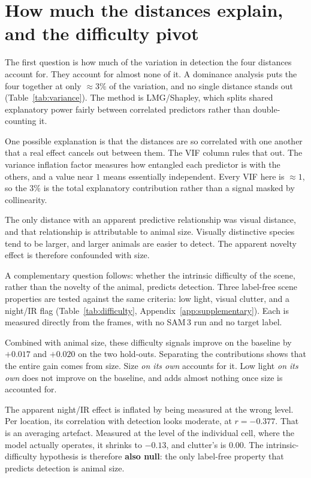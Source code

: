 \section{How much the distances explain, and the difficulty pivot}
\label{sec:variance-difficulty}
The first question is how much of the variation in detection the four distances account for. They account
for almost none of it. A dominance analysis puts the four together at only $\approx 3\%$ of the variation, and no single
distance stands out (Table~\ref{tab:variance}). The method is LMG/Shapley, which splits shared explanatory
power fairly between correlated predictors rather than double-counting it.

One possible explanation is that the distances are so correlated with one another that a real effect cancels out
between them. The VIF column rules that out. The variance inflation factor measures how entangled each
predictor is with the others, and a value near $1$ means essentially independent. Every VIF here is
$\approx 1$, so the $3\%$ is the total explanatory contribution rather than a signal masked by collinearity.


The only distance with an apparent predictive relationship was visual distance, and that relationship is
attributable to animal size. Visually distinctive species tend to be larger, and larger animals are easier to
detect. The apparent novelty effect is therefore confounded with size.

A complementary question follows: whether the intrinsic difficulty of the scene, rather than the novelty of
the animal, predicts detection. Three label-free scene properties are tested against the same criteria: low
light, visual clutter, and a night/IR flag (Table~\ref{tab:difficulty}, Appendix~\ref{app:supplementary}).
Each is measured directly from the frames, with no SAM\,3 run and no target label.

Combined with animal size, these difficulty signals improve on the baseline by $+0.017$ and $+0.020$ on the
two hold-outs. Separating the contributions shows that the entire gain comes from size. Size \emph{on its
own} accounts for it. Low light \emph{on its own} does not improve on the baseline, and adds almost nothing
once size is accounted for.

The apparent night/IR effect is inflated by being measured at the wrong level. Per location, its correlation
with detection looks moderate, at $r=-0.377$. That is an averaging artefact. Measured at the level of the
individual cell, where the model actually operates, it shrinks to $-0.13$, and clutter's is $0.00$. The
intrinsic-difficulty hypothesis is therefore \textbf{also null}: the only label-free property that predicts
detection is animal size.


